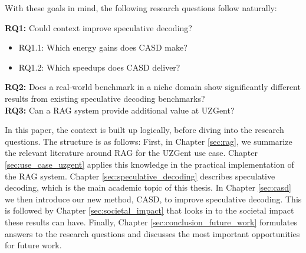 With these goals in mind, the following research questions follow naturally:

\begin{tcolorbox}[colback=blue-ish-light,colframe=blue-ish,title=\textbf{Research Questions}, coltitle=white]
    \textbf{RQ1:} Could context improve speculative decoding?
    \begin{itemize}
    \item RQ1.1: Which energy gains does CASD make?
    \item RQ1.2: Which speedups does CASD deliver?
    \end{itemize}
    \textbf{RQ2:} Does a real-world benchmark in a niche domain show significantly different results from existing speculative decoding benchmarks? \\
    \textbf{RQ3:} Can a RAG system provide additional value at UZGent? \\
\end{tcolorbox}

In this paper, the context is built up logically, before diving into the research questions. The structure is as follows: First, in Chapter \ref{sec:rag}, we summarize the relevant literature around RAG for the UZGent use case. Chapter \ref{sec:use_case_uzgent} applies this knowledge in the practical implementation of the RAG system. Chapter \ref{sec:speculative_decoding} describes speculative decoding, which is the main academic topic of this thesis. In Chapter \ref{sec:casd} we then introduce our new method, CASD, to improve speculative decoding. This is followed by Chapter \ref{sec:societal_impact} that looks in to the societal impact these results can have. Finally, Chapter \ref{sec:conclusion_future_work} formulates answers to the research questions and discusses the most important opportunities for future work.\\